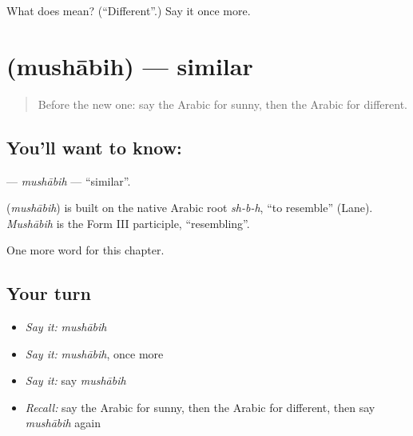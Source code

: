 \begin{tcolorbox}[breakable,colback=teal!4,colframe=teal!35!black,title={Before you move on}]
What does  mean? (\textquotedblleft{}Different\textquotedblright{}.) Say it once more.
\end{tcolorbox}
\section[\texorpdfstring{\ar{مشابه} (mushābih)}{مشابه (mushābih)}]{ (mushābih) — similar}

\label{lesson:AR-C211-mushabih}



\begin{quote}
Before the new one: say the Arabic for sunny, then the Arabic for different.
\end{quote}

\subsection*{You'll want to know: }
\textbf{} — \emph{mushābih} — \textquotedblleft{}similar\textquotedblright{}.

\begin{cousinweb}
\textbf{} (\emph{mushābih}) is built on the native Arabic root \emph{sh-b-h}, \textquotedblleft{}to resemble\textquotedblright{} (Lane). \emph{Mushābih} is the Form III participle, \textquotedblleft{}resembling\textquotedblright{}.
\end{cousinweb}

\begin{grammarlens}[title={What you've built}]
One more word for this chapter.
\end{grammarlens}

\subsection*{Your turn}
\begin{itemize}
\raggedright
  \item \emph{Say it:} \emph{mushābih}
  \item \emph{Say it:} \emph{mushābih}, once more
  \item \emph{Say it:} say \emph{mushābih}
  \item \emph{Recall:} say the Arabic for sunny, then the Arabic for different, then say \emph{mushābih} again
\end{itemize}

